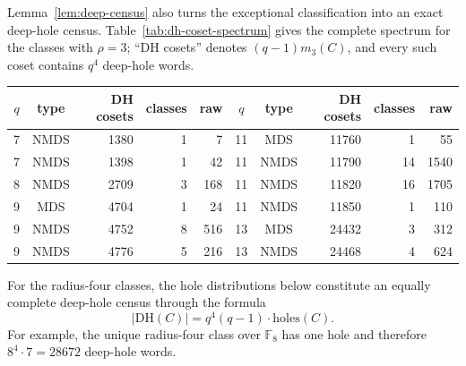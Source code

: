 ﻿\documentclass[11pt]{article}
\newcommand{\F}{\mathbb F}
\theoremstyle{plain}
\theoremstyle{definition}
\begin{document}
Lemma~\ref{lem:deep-census} also turns the exceptional classification
into an exact deep-hole census.  Table~\ref{tab:dh-coset-spectrum} gives
the complete spectrum for the classes with \(\rho=3\); ``DH cosets'' denotes
\((q-1)m_3(C)\), and every such coset contains \(q^4\) deep-hole words.
\begin{center}
\label{tab:dh-coset-spectrum}
\small
\begin{tabular}{c c r r r@{\qquad}c c r r r}
\toprule
\(q\)&type&DH cosets&classes&raw&
\(q\)&type&DH cosets&classes&raw\\
\midrule
7  & NMDS & 1380  & 1  & 7    & 11 & MDS  & 11760 & 1  & 55\\
7  & NMDS & 1398  & 1  & 42   & 11 & NMDS & 11790 & 14 & 1540\\
8  & NMDS & 2709  & 3  & 168  & 11 & NMDS & 11820 & 16 & 1705\\
9  & MDS  & 4704  & 1  & 24   & 11 & NMDS & 11850 & 1  & 110\\
9  & NMDS & 4752  & 8  & 516  & 13 & MDS  & 24432 & 3  & 312\\
9  & NMDS & 4776  & 5  & 216  & 13 & NMDS & 24468 & 4  & 624\\
\bottomrule
\end{tabular}
\end{center}
For the radius-four classes, the hole distributions below constitute an
equally complete deep-hole census through the formula
\[
  |\mathrm{DH}(C)|=q^4(q-1)\cdot\mathrm{holes}(C).
\]
For example, the unique radius-four class over \(\F_8\) has one hole and
therefore \(8^4\cdot7=28672\) deep-hole words.
\end{document}
